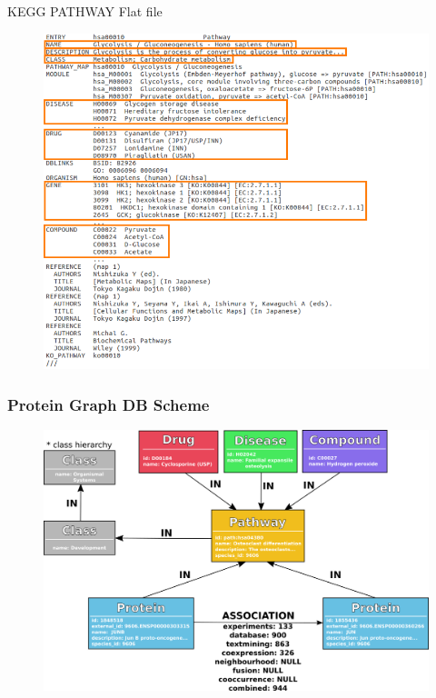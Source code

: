 \documentclass{beamer}
\begin{document}
\begin{frame}{KEGG PATHWAY Flat file}
\begin{figure}
    \centering
    \includegraphics[width=0.8\linewidth]{kegg-flat-file.png}
\end{figure}
\end{frame}

\begin{frame}
\frametitle{Protein Graph DB Scheme}
\begin{figure}
    \centering
    \includegraphics[width=0.9\linewidth]{database_scheme.png}
\end{figure}
\end{frame}
\end{document}
